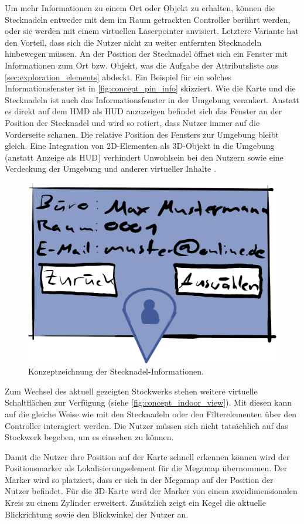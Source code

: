 Um mehr Informationen zu einem Ort oder Objekt zu erhalten, können die Stecknadeln entweder mit dem im Raum getrackten Controller berührt werden, oder sie werden mit einem virtuellen Laserpointer anvisiert.
Letztere Variante hat den Vorteil, dass sich die Nutzer nicht zu weiter entfernten Stecknadeln hinbewegen müssen.
An der Position der Stecknadel öffnet sich ein Fenster mit Informationen zum Ort bzw. Objekt, was die Aufgabe der Attributsliste aus \autoref{sec:exploration_elements} abdeckt.
Ein Beispiel für ein solches Informationsfenster ist in \autoref{fig:concept_pin_info} skizziert.
Wie die Karte und die Stecknadeln ist auch das Informationsfenster in der Umgebung verankert.
Anstatt es direkt auf dem HMD als HUD anzuzeigen befindet sich das Fenster an der Position der Stecknadel und wird so rotiert, dass Nutzer immer auf die Vorderseite schauen.
Die relative Position des Fensters zur Umgebung bleibt gleich.
Eine Integration von 2D-Elementen als 3D-Objekt in die Umgebung (anstatt Anzeige als HUD) verhindert Unwohlsein bei den Nutzern sowie eine Verdeckung der Umgebung und anderer virtueller Inhalte \parencite{Schroeder2017}.
\begin{figure}[thb]
    \centering
        \includegraphics[width=0.5\linewidth]{figures/concept/concept_location_info}
    \caption{Konzeptzeichnung der Stecknadel-Informationen.}
    \label{fig:concept_pin_info}
\end{figure}

Zum Wechsel des aktuell gezeigten Stockwerks stehen weitere virtuelle Schaltflächen zur Verfügung (siehe \autoref{fig:concept_indoor_view}).
Mit diesen kann auf die gleiche Weise wie mit den Stecknadeln oder den Filterelementen über den Controller interagiert werden.
Die Nutzer müssen sich nicht tatsächlich auf das Stockwerk begeben, um es einsehen zu können.

Damit die Nutzer ihre Position auf der Karte schnell erkennen können wird der Positionsmarker als Lokalisierungselement für die Megamap übernommen.
Der Marker wird so platziert, dass er sich in der Megamap auf der Position der Nutzer befindet.
Für die 3D-Karte wird der Marker von einem zweidimensionalen Kreis zu einem Zylinder erweitert.
Zusätzlich zeigt ein Kegel die aktuelle Blickrichtung sowie den Blickwinkel der Nutzer an.

